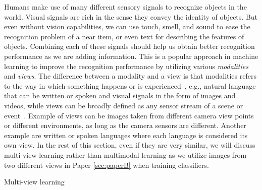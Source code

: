 Humans make use of many different sensory signals to recognize objects in the world. Visual signals are rich in the sense they convey the identity of objects. But even without vision capabilities, we can use touch, smell, and sound to ease the recognition problem of a near item, or even text for describing the features of objects. Combining each of these signals should help us obtain better recognition performance as we are adding information. This is a popular approach in machine learning to improve the recognition performance by utilizing various \textit{modalities} and \textit{views}. The difference between a modality and a view is that modalities refers to the way in which something happens or is experienced~\cite{baltruvsaitis2018multimodal}, e.g., natural language that can be written or spoken and visual signals in the form of images and videos, while views can be broadly defined as any sensor stream of a scene or event~\cite{salzmann2010factorized}. Example of views can be images taken from different camera view points or different environments, as long as the camera sensors are different. Another example are written or spoken languages where each language is considered its own view. In the rest of this section, even if they are very similar, we will discuss multi-view learning rather than multimodal learning as we utilize images from two different views in Paper \ref{sec:paperB} when training classifiers. 

Multi-view learning 



